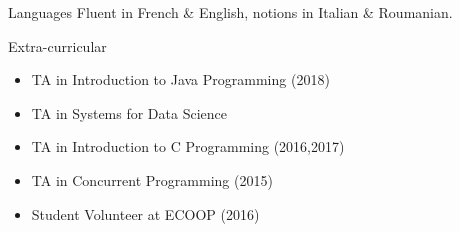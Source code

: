 


\begin{cvskills}


\cvskill
{Languages} %
{Fluent in French \& English, notions in Italian \& Roumanian.} %

\cvskill
{Extra-curricular}
{
	\begin{itemize}
  \item TA in Introduction to Java Programming (2018)
  \item TA in Systems for Data Science
	\item TA in Introduction to C Programming (2016,2017)
	\item TA in Concurrent Programming (2015)
	\item Student Volunteer at ECOOP (2016)
	\end{itemize}
}


\end{cvskills}
